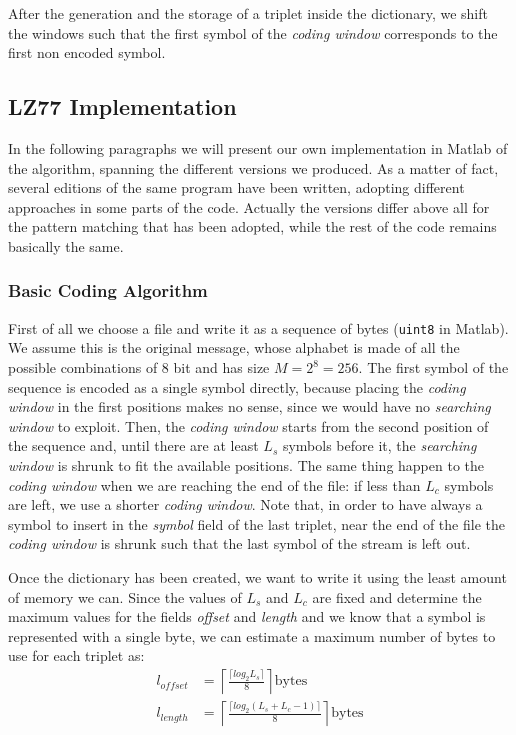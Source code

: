 After the generation and the storage of a triplet inside the dictionary, we shift the windows such that the first symbol of the \textit{coding window} corresponds to the first non encoded symbol.

\subsection{LZ77 Implementation} \label{subsec:lz77implem}
In the following paragraphs we will present our own implementation in Matlab of the algorithm, spanning the different versions we produced. As a matter of fact, several editions of the same program have been written, adopting different approaches in some parts of the code. Actually the versions differ above all for the pattern matching that has been adopted, while the rest of the code remains basically the same.

\subsubsection{Basic Coding Algorithm} \label{subsubsec:basiclz77}
First of all we choose a file and write it as a sequence of bytes (\texttt{uint8} in Matlab). We assume this is the original message, whose alphabet is made of all the possible combinations of $8$ bit and has size $M = 2^8 = 256$. The first symbol of the sequence is encoded as a single symbol directly, because placing the \textit{coding window} in the first positions makes no sense, since we would have no \textit{searching window} to exploit. Then, the \textit{coding window} starts from the second position of the sequence and, until there are at least $L_s$ symbols before it, the \textit{searching window} is shrunk to fit the available positions. The same thing happen to the \textit{coding window} when we are reaching the end of the file: if less than $L_c$ symbols are left, we use a shorter \textit{coding window}. Note that, in order to have always a symbol to insert in the \textit{symbol} field of the last triplet, near the end of the file the \textit{coding window} is shrunk such that the last symbol of the stream is left out.

Once the dictionary has been created, we want to write it using the least amount of memory we can. Since the values of $L_s$ and $L_c$ are fixed and determine the maximum values for the fields \textit{offset} and \textit{length} and we know that a symbol is represented with a single byte, we can estimate a maximum number of bytes to use for each triplet as:
\begin{align}
l_{offset} &= \left \lceil \frac{\lceil log_2L_s \rceil}{8} \right \rceil \text{bytes} \\
l_{length} &= \left \lceil \frac{\lceil log_2(L_s + L_c - 1) \rceil }{8} \right \rceil \text{bytes} 
\end{align}

